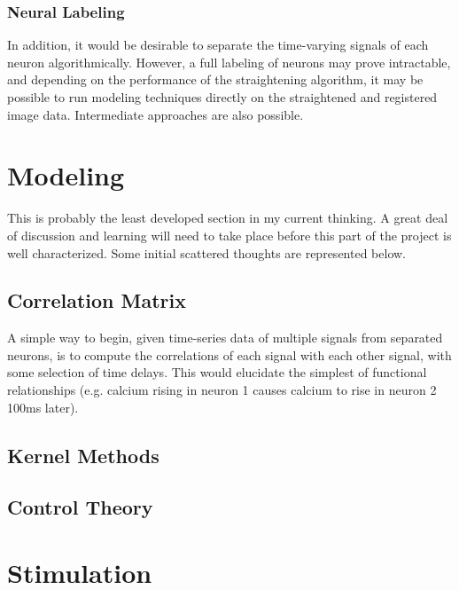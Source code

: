 \documentclass[letter,11pt]{article}
\begin{document}
\subsubsection{Neural Labeling}

In addition, it would be desirable to separate the time-varying signals of each neuron
algorithmically. However, a full labeling of neurons may prove intractable, and depending
on the performance of the straightening algorithm, it may be possible to run modeling
techniques directly on the straightened and registered image data. Intermediate approaches
are also possible.


\section{Modeling}


This is probably the least developed section in my current thinking. A great deal
of discussion and learning will need to take place before this part of the project is
well characterized. Some initial scattered thoughts are represented below.

\subsection{Correlation Matrix}

A simple way to begin, given time-series data of multiple signals from
separated neurons, is to compute the correlations of each signal with each
other signal, with some selection of time delays. This would elucidate the
simplest of functional relationships (e.g. calcium rising in neuron 1 causes
calcium to rise in neuron 2 100ms later).

\subsection{Kernel Methods}


\subsection{Control Theory}



\section{Stimulation}
\label{stimulation}
\end{document}
